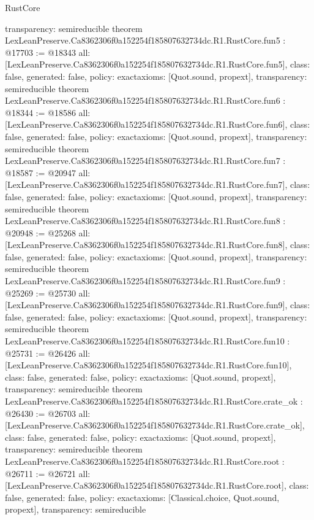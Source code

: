 \begin{lexlean}{RustCore}
\begin{coremodule}
{  transparency: semireducible
}
theorem LexLeanPreserve.Ca8362306f0a152254f185807632734dc.R1.RustCore.fun5 : @17703 := @18343 {
  all: [LexLeanPreserve.Ca8362306f0a152254f185807632734dc.R1.RustCore.fun5],
  class: false,
  generated: false,
  policy: exact{axioms: [Quot.sound, propext]},
  transparency: semireducible
}
theorem LexLeanPreserve.Ca8362306f0a152254f185807632734dc.R1.RustCore.fun6 : @18344 := @18586 {
  all: [LexLeanPreserve.Ca8362306f0a152254f185807632734dc.R1.RustCore.fun6],
  class: false,
  generated: false,
  policy: exact{axioms: [Quot.sound, propext]},
  transparency: semireducible
}
theorem LexLeanPreserve.Ca8362306f0a152254f185807632734dc.R1.RustCore.fun7 : @18587 := @20947 {
  all: [LexLeanPreserve.Ca8362306f0a152254f185807632734dc.R1.RustCore.fun7],
  class: false,
  generated: false,
  policy: exact{axioms: [Quot.sound, propext]},
  transparency: semireducible
}
theorem LexLeanPreserve.Ca8362306f0a152254f185807632734dc.R1.RustCore.fun8 : @20948 := @25268 {
  all: [LexLeanPreserve.Ca8362306f0a152254f185807632734dc.R1.RustCore.fun8],
  class: false,
  generated: false,
  policy: exact{axioms: [Quot.sound, propext]},
  transparency: semireducible
}
theorem LexLeanPreserve.Ca8362306f0a152254f185807632734dc.R1.RustCore.fun9 : @25269 := @25730 {
  all: [LexLeanPreserve.Ca8362306f0a152254f185807632734dc.R1.RustCore.fun9],
  class: false,
  generated: false,
  policy: exact{axioms: [Quot.sound, propext]},
  transparency: semireducible
}
theorem LexLeanPreserve.Ca8362306f0a152254f185807632734dc.R1.RustCore.fun10 : @25731 := @26426 {
  all: [LexLeanPreserve.Ca8362306f0a152254f185807632734dc.R1.RustCore.fun10],
  class: false,
  generated: false,
  policy: exact{axioms: [Quot.sound, propext]},
  transparency: semireducible
}
theorem LexLeanPreserve.Ca8362306f0a152254f185807632734dc.R1.RustCore.crate_ok : @26430 := @26703 {
  all: [LexLeanPreserve.Ca8362306f0a152254f185807632734dc.R1.RustCore.crate_ok],
  class: false,
  generated: false,
  policy: exact{axioms: [Quot.sound, propext]},
  transparency: semireducible
}
theorem LexLeanPreserve.Ca8362306f0a152254f185807632734dc.R1.RustCore.root : @26711 := @26721 {
  all: [LexLeanPreserve.Ca8362306f0a152254f185807632734dc.R1.RustCore.root],
  class: false,
  generated: false,
  policy: exact{axioms: [Classical.choice, Quot.sound, propext]},
  transparency: semireducible
}


\end{coremodule}
\end{lexlean}
